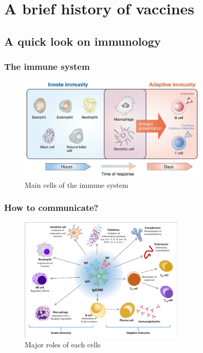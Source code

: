 \section{A brief history of vaccines}
\subsection{A quick look on immunology}


\begin{frame}
    \frametitle{The immune system}
\begin{figure}
    \centering
    \includegraphics[width=0.8\textwidth]{imgs/ImmunityCells.png}
    \caption{Main cells of the immune system \autocite{yamauchiHippoPathwayMammalian2019}}
    \label{fig:responses3}
\end{figure}
\end{frame}

\begin{frame}
    \frametitle{How to communicate?}
\begin{figure}
    \centering
    \includegraphics[width=0.7\textwidth]{imgs/Communication.png}
    \caption{Major roles of each cells \autocite{jarczakSepsisPathophysiologyTherapeutic2021}}
    \label{fig:responses10}
\end{figure}
\end{frame}


